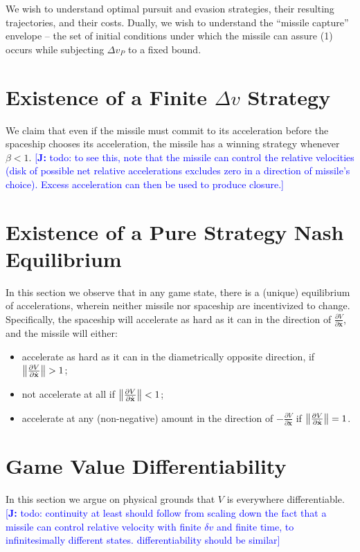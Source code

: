 \documentclass{article}
\newcommand{\authnote}[3]{\textcolor{#3}{[{\footnotesize {\bf #1:} { {#2}}}]}}
\newcommand{\jnote}[1]{\authnote{J}{#1}{blue} }
\renewcommand{\vec}[1]{\mathbf{#1}}
\begin{document}
We wish to understand optimal pursuit and evasion strategies, their resulting
trajectories, and their costs.  Dually, we wish to understand the ``missile
capture'' envelope -- the set of initial conditions under which the missile can
assure (1) occurs while subjecting $\Delta v_P$ to a fixed bound.


\section{Existence of a Finite $\Delta v$ Strategy}
We claim that even if the missile must commit to its acceleration before the
spaceship chooses its acceleration, the missile has a winning strategy whenever
$\beta < 1$.  \jnote{todo: to see this, note that the missile can control the
  relative velocities (disk of possible net relative accelerations excludes zero
  in a direction of missile's choice).  Excess acceleration can then be used to
  produce closure.}

\section{Existence of a Pure Strategy Nash Equilibrium}
In this section we observe that in any game state, there is a (unique) equilibrium
of accelerations, wherein neither missile nor spaceship are incentivized to
change.  Specifically, the spaceship will accelerate as hard as it can in the
direction of $\frac{\partial V}{\partial \dot{\vec{x}}}$, and the missile will
either:
\begin{itemize}
\item
accelerate as hard as it can in the diametrically opposite direction, if
$\norm{\frac{\partial V}{\partial \dot{\vec{x}}}} > 1$;
\item not accelerate at all if $\norm{\frac{\partial V}{\partial \dot{\vec{x}}}}
  < 1$;
\item accelerate at any (non-negative) amount in the direction of
  $-\frac{\partial V}{\partial \dot{\vec{x}}}$ if
  $\norm{\frac{\partial V}{\partial \dot{\vec{x}}}} = 1$.
\end{itemize}

\section{Game Value Differentiability}
In this section we argue on physical grounds that $V$ is everywhere differentiable.
\jnote{todo: continuity at least  should follow from scaling down the fact that a missile can
  control relative velocity with finite $\delta v$ and finite time, to
  infinitesimally different states.  differentiability should be similar}
\end{document}

